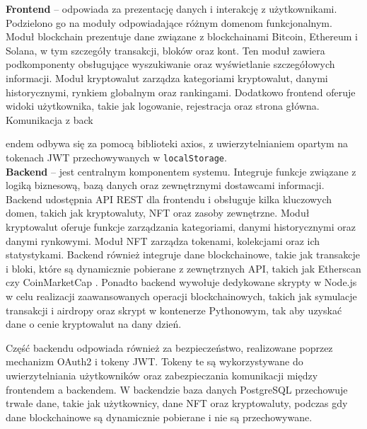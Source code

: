 \noindent \textbf{Frontend} -- %
odpowiada za prezentację danych i interakcję z użytkownikami. Podzielono go na moduły odpowiadające różnym domenom funkcjonalnym. Moduł blockchain prezentuje dane związane z blockchainami Bitcoin, Ethereum i Solana, w tym szczegóły transakcji, bloków oraz kont. Ten moduł zawiera podkomponenty obsługujące wyszukiwanie oraz wyświetlanie szczegółowych informacji. Moduł kryptowalut zarządza kategoriami kryptowalut, danymi historycznymi, rynkiem globalnym oraz rankingami. Dodatkowo frontend oferuje widoki użytkownika, takie jak logowanie, rejestracja oraz strona główna. Komunikacja z back
\begin{center}
\begin{flushleft}

\end{flushleft}
\end{center}
endem odbywa się za pomocą biblioteki axios, z uwierzytelnianiem opartym na tokenach JWT przechowywanych w \texttt{localStorage}.\\[-10pt]

\noindent \textbf{Backend} -- %
jest centralnym komponentem systemu. Integruje funkcje związane z logiką biznesową, bazą danych oraz zewnętrznymi dostawcami informacji. Backend udostępnia API REST dla frontendu i obsługuje kilka kluczowych domen, takich jak kryptowaluty, NFT oraz zasoby zewnętrzne. Moduł kryptowalut oferuje funkcje zarządzania kategoriami, danymi historycznymi oraz danymi rynkowymi. Moduł NFT zarządza tokenami, kolekcjami oraz ich statystykami. Backend również integruje dane blockchainowe, takie jak transakcje i bloki, które są dynamicznie pobierane z zewnętrznych API, takich jak Etherscan \cite{etherscan_api} czy CoinMarketCap \cite{coinmarketcap_api}. Ponadto backend wywołuje dedykowane skrypty w Node.js w celu realizacji zaawansowanych operacji blockchainowych, takich jak symulacje transakcji i airdropy oraz skrypt w kontenerze Pythonowym, tak aby uzyskać dane o cenie kryptowalut na dany dzień.

Część backendu odpowiada również za bezpieczeństwo, realizowane poprzez mechanizm OAuth2 i tokeny JWT. Tokeny te są wykorzystywane do uwierzytelniania użytkowników oraz zabezpieczania komunikacji między frontendem a backendem. W backendzie baza danych PostgreSQL przechowuje trwałe dane, takie jak użytkownicy, dane NFT oraz kryptowaluty, podczas gdy dane blockchainowe są dynamicznie pobierane i nie są przechowywane.\\[-10pt]

